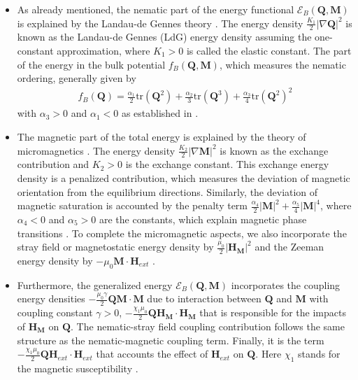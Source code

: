 \documentclass{article}
\def\Qvec{\mathbf{Q}}
\def \Mvec{\mathbf{M}}
\def\Hvec{\mathbf{H}}
\begin{document}
\begin{itemize}
\item As already mentioned, the nematic part of the energy functional $\mathcal{E}_B\left(\Qvec, \Mvec\right)$ is explained by the Landau-de Gennes theory \cite{Gennes}. The energy density $\frac{K_1}{2}|\nabla\Qvec|^2$ is known as the Landau-de Gennes (LdG) energy density assuming the one-constant approximation, where $K_1>0$ is called the elastic constant. The part of the energy in the bulk potential $f_B\left(\Qvec, \Mvec\right)$, which measures the nematic ordering, generally given by
\begin{eqnarray}
f_B\left(\Qvec\right)=\frac{\alpha_1}{2}\mbox{tr}(\Qvec^2) + \frac{\alpha_2}{3}\mbox{tr}(\Qvec^3) + \frac{\alpha_3}{4}\mbox{tr}(\Qvec^2)^2
\end{eqnarray}
with $\alpha_3>0$ and $\alpha_1<0$ as established in \cite{Gennes}.
\item The magnetic part of the total energy is explained by the theory of micromagnetics \cite{brown1966magnetoelastic}. The energy density $\frac{K_2}{2}|\nabla\Mvec|^2$ is known as the exchange contribution and $K_2>0$ is the exchange constant. This exchange energy density is a penalized contribution, which measures the deviation of magnetic orientation from the equilibrium directions. Similarly, the deviation of magnetic saturation is accounted by the penalty term $\frac{\alpha_4}{2}|\Mvec|^2 + \frac{\alpha_5}{4}|\Mvec|^4$, where $\alpha_4<0$ and $\alpha_5>0$ are the constants, which explain magnetic phase transitions \cite{hubert2008magnetic, Pleiner}. To complete the micromagnetic aspects, we also incorporate the stray field or magnetostatic energy density by $\frac{\mu_0}{2}|\Hvec_{\Mvec}|^2$ and the Zeeman energy density by $-\mu_0\Mvec\cdot\Hvec_{ext}$ \cite{hubert2008magnetic}.
\item Furthermore, the generalized energy $\mathcal{E}_B\left(\Qvec, \Mvec\right)$ incorporates the coupling energy densities $- \frac{\mu_0\gamma}{2}\Qvec\Mvec\cdot\Mvec$ due to interaction between $\Qvec$ and $\Mvec$ with coupling constant $\gamma>0$, $-\frac{\chi_1\mu_0}{2}\Qvec\Hvec_{\Mvec}\cdot\Hvec_{\Mvec}$ that is responsible for the impacts of $\Hvec_{\Mvec}$ on $\Qvec$. The nematic-stray field coupling contribution follows the same structure as the nematic-magnetic coupling term. Finally, it is the term $-\frac{\chi_1\mu_0}{2}\Qvec\Hvec_{ext}\cdot\Hvec_{ext}$ that accounts the effect of $\Hvec_{ext}$ on $\Qvec$. Here $\chi_1$ stands for the magnetic susceptibility \cite{Mertelj}.
\end{itemize}
\end{document}
